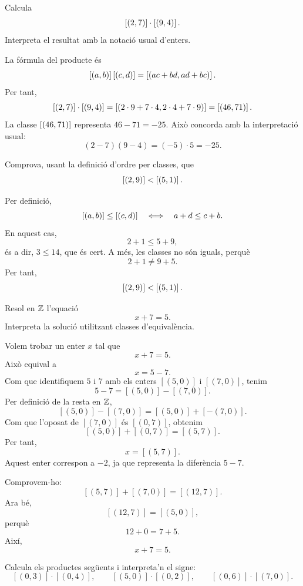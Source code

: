 \begin{exercici}
Calcula
\[
\left[(2,7)\right]\cdot\left[(9,4)\right].
\]
Interpreta el resultat amb la notació usual d'enters.
\end{exercici}

\begin{solucio}
La fórmula del producte és
\[
\left[(a,b)\right]\left[(c,d)\right]=\left[(ac+bd,ad+bc)\right].
\]
Per tant,
\[
\left[(2,7)\right]\cdot\left[(9,4)\right]
=\left[(2\cdot9+7\cdot4,2\cdot4+7\cdot9)\right]
=\left[(46,71)\right].
\]
La classe \(\left[(46,71)\right]\) representa \(46-71=-25\). Això concorda amb la interpretació usual:
\[
(2-7)(9-4)=(-5)\cdot5=-25.
\]
\end{solucio}

\begin{exercici}[Ordre en \(\Z\)]
Comprova, usant la definició d'ordre per classes, que
\[
\left[(2,9)\right]<\left[(5,1)\right].
\]
\end{exercici}

\begin{solucio}
Per definició,
\[
\left[(a,b)\right]\le\left[(c,d)\right]
\quad\Longleftrightarrow\quad
 a+d\le c+b.
\]
En aquest cas,
\[
2+1\le5+9,
\]
és a dir, \(3\le14\), que és cert. A més, les classes no són iguals, perquè
\[
2+1\ne9+5.
\]
Per tant,
\[
\left[(2,9)\right]<\left[(5,1)\right].
\]
\end{solucio}

\begin{exercici}[Equacions de la forma \(x+a=b\)]
Resol en $\Z$ l'equació
\[
x+7=5.
\]
Interpreta la solució utilitzant classes d'equivalència.
\end{exercici}

\begin{solucio}
Volem trobar un enter $x$ tal que
\[
x+7=5.
\]
Això equival a
\[
x=5-7.
\]
Com que identifiquem $5$ i $7$ amb els enters $[(5,0)]$ i $[(7,0)]$, tenim
\[
5-7=[(5,0)]-[(7,0)].
\]
Per definició de la resta en $\Z$,
\[
[(5,0)]-[(7,0)]=[(5,0)]+[-(7,0)].
\]
Com que l'oposat de $[(7,0)]$ és $[(0,7)]$, obtenim
\[
[(5,0)]+[(0,7)]=[(5,7)].
\]
Per tant,
\[
x=[(5,7)].
\]
Aquest enter correspon a $-2$, ja que representa la diferència $5-7$.

Comprovem-ho:
\[
[(5,7)]+[(7,0)]=[(12,7)].
\]
Ara bé,
\[
[(12,7)]=[(5,0)],
\]
perquè
\[
12+0=7+5.
\]
Així,
\[
x+7=5.
\]
\end{solucio}


\begin{exercici}
Calcula els productes següents i interpreta'n el signe:
\[
[(0,3)]\cdot[(0,4)],
\qquad
[(5,0)]\cdot[(0,2)],
\qquad
[(0,6)]\cdot[(7,0)].
\]
\end{exercici}

